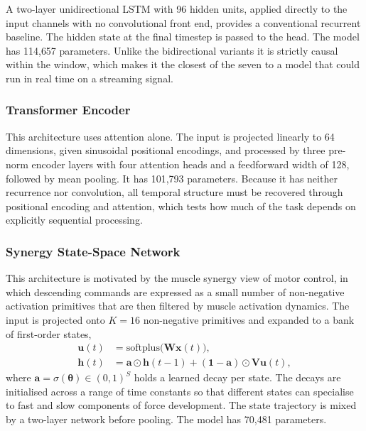 A two-layer unidirectional LSTM with 96 hidden units, applied directly to the
input channels with no convolutional front end, provides a conventional
recurrent baseline. The hidden state at the final timestep is passed to the head.
The model has 114{,}657 parameters. Unlike the bidirectional variants it is
strictly causal within the window, which makes it the closest of the seven to a
model that could run in real time on a streaming signal.

\subsubsection{Transformer Encoder}
\label{sec:transformer}

This architecture uses attention alone. The input is projected linearly to 64
dimensions, given sinusoidal positional encodings, and processed by three
pre-norm encoder layers with four attention heads and a feedforward width of 128,
followed by mean pooling. It has 101{,}793 parameters. Because it has neither
recurrence nor convolution, all temporal structure must be recovered through
positional encoding and attention, which tests how much of the task depends on
explicitly sequential processing.

\subsubsection{Synergy State-Space Network}
\label{sec:synergy}

This architecture is motivated by the muscle synergy view of motor control, in
which descending commands are expressed as a small number of non-negative
activation primitives that are then filtered by muscle activation dynamics. The
input is projected onto $K = 16$ non-negative primitives and expanded to a bank
of first-order states,
\begin{align}
  \mathbf{u}(t) &= \mathrm{softplus}\!\big(\mathbf{W}\mathbf{x}(t)\big),
  \label{eq:synergy_u} \\
  \mathbf{h}(t) &= \mathbf{a} \odot \mathbf{h}(t-1)
                 + (\mathbf{1} - \mathbf{a}) \odot \mathbf{V}\mathbf{u}(t),
  \label{eq:synergy_h}
\end{align}
where $\mathbf{a} = \sigma(\boldsymbol{\theta}) \in (0,1)^{S}$ holds a learned
decay per state. The decays are initialised across a range of time constants so
that different states can specialise to fast and slow components of force
development. The state trajectory is mixed by a two-layer network before pooling.
The model has 70{,}481 parameters.

